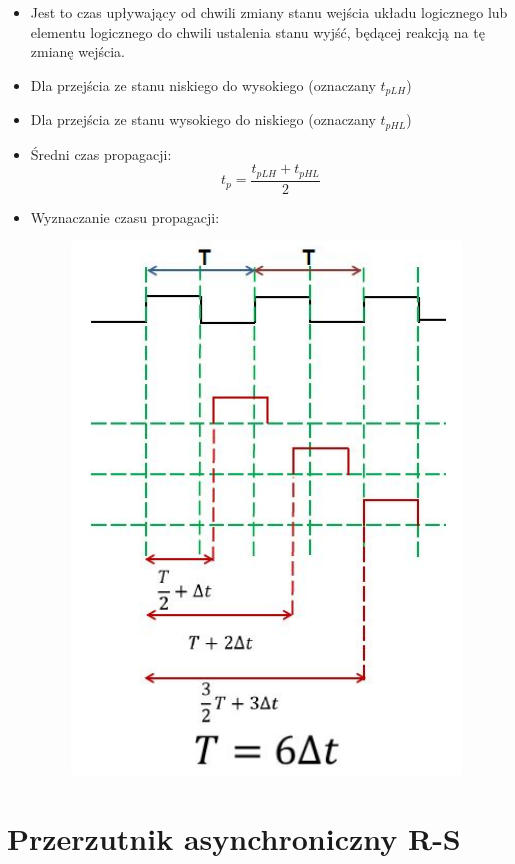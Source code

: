 \begin{itemize}
    \item Jest to czas upływający od chwili zmiany stanu wejścia układu logicznego lub elementu logicznego do chwili ustalenia stanu wyjść, będącej reakcją na tę zmianę wejścia.
    \item Dla przejścia ze stanu niskiego do wysokiego (oznaczany $t_{pLH}$)
    \item Dla przejścia ze stanu wysokiego do niskiego (oznaczany $t_{pHL}$)
    \item Średni czas propagacji:
        \begin{equation}
            \label{propagacja:sredni_czas} t_p = \dfrac{t_{pLH}+t_{pHL}}{2}
        \end{equation}
    \item Wyznaczanie czasu propagacji:
        \begin{figure}[H]
            \centering
            \includegraphics[scale=0.8]{img/schemes/wyznaczanie_czasu_propagacji.png}
            \label{propagacja:wyznaczanie_czasu_propagacji}
        \end{figure}
\end{itemize}

\pagebreak

\section{Przerzutnik asynchroniczny R-S}

